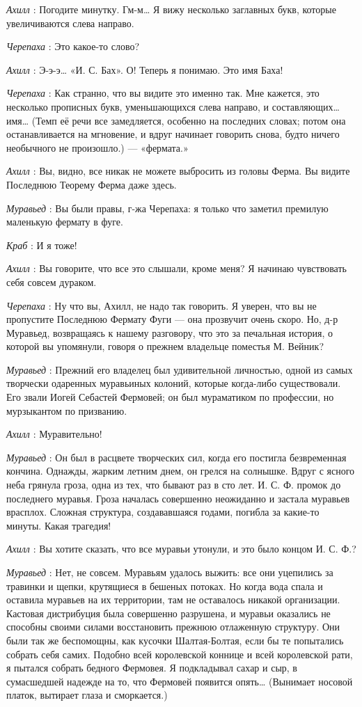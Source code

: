\documentclass[../main.tex]{subfiles}
\begin{document}
\begin{dialogue}
\emph{Ахилл} : Погодите минутку. Гм-м\ldots{} Я вижу несколько заглавных букв, которые увеличиваются слева направо.

\emph{Черепаха} : Это какое-то слово?

\emph{Ахилл} : Э-э-э\ldots{} «И. С. Бах». О! Теперь я понимаю. Это имя Баха!

\emph{Черепаха} : Как странно, что вы видите это именно так. Мне кажется, это несколько прописных букв, уменьшающихся слева направо, и составляющих\ldots{} имя\ldots{} (Темп её речи все замедляется, особенно на последних словах; потом она останавливается на мгновение, и вдруг начинает говорить снова, будто ничего необычного не произошло.) --- «фермата.»

\emph{Ахилл} : Вы, видно, все никак не можете выбросить из головы Ферма. Вы видите Последнюю Теорему Ферма даже здесь.

\emph{Муравьед} : Вы были правы, г-жа Черепаха: я только что заметил премилую маленькую фермату в фуге.

\emph{Краб} : И я тоже!

\emph{Ахилл} : Вы говорите, что все это слышали, кроме меня? Я начинаю чувствовать себя совсем дураком.

\emph{Черепаха} : Ну что вы, Ахилл, не надо так говорить. Я уверен, что вы не пропустите Последнюю Фермату Фуги --- она прозвучит очень скоро. Но, д-р Муравьед, возвращаясь к нашему разговору, что это за печальная история, о которой вы упомянули, говоря о прежнем владельце поместья М. Вейник?

\emph{Муравьед} : Прежний его владелец был удивительной личностью, одной из самых творчески одаренных муравьиных колоний, которые когда-либо существовали. Его звали Иогей Себастей Фермовей; он был мураматиком по профессии, но мурзыкантом по призванию.

\emph{Ахилл} : Муравительно!

\emph{Муравьед} : Он был в расцвете творческих сил, когда его постигла безвременная кончина. Однажды, жарким летним днем, он грелся на солнышке. Вдруг с ясного неба грянула гроза, одна из тех, что бывают раз в сто лет. И. С. Ф. промок до последнего муравья. Гроза началась совершенно неожиданно и застала муравьев врасплох. Сложная структура, создававшаяся годами, погибла за какие-то минуты. Какая трагедия!

\emph{Ахилл} : Вы хотите сказать, что все муравьи утонули, и это было концом И. С. Ф.?

\emph{Муравьед} : Нет, не совсем. Муравьям удалось выжить: все они уцепились за травинки и щепки, крутящиеся в бешеных потоках. Но когда вода спала и оставила муравьев на их территории, там не оставалось никакой организации. Кастовая дистрибуция была совершенно разрушена, и муравьи оказались не способны своими силами восстановить прежнюю отлаженную структуру. Они были так же беспомощны, как кусочки Шалтая-Болтая, если бы те попытались собрать себя самих. Подобно всей королевской коннице и всей королевской рати, я пытался собрать бедного Фермовея. Я подкладывал сахар и сыр, в сумасшедшей надежде на то, что Фермовей появится опять\ldots{} (Вынимает носовой платок, вытирает глаза и сморкается.)


\end{dialogue}
\end{document}

